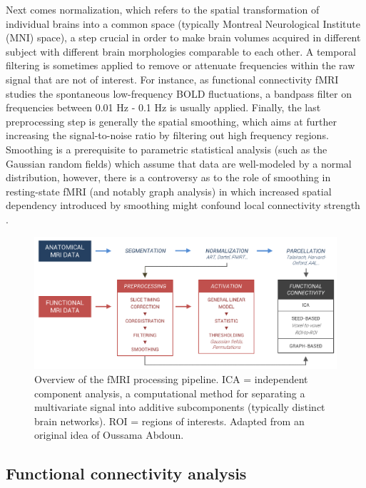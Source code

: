 Next comes normalization, which refers to the spatial transformation of individual brains into a common space (typically Montreal Neurological Institute (MNI) space), a step crucial in order to make brain volumes acquired in different subject with different brain morphologies comparable to each other. A temporal filtering is sometimes applied to remove or attenuate frequencies within the raw signal that are not of interest. For instance, as functional connectivity fMRI studies the spontaneous low-frequency BOLD fluctuations, a bandpass filter on frequencies between 0.01 Hz - 0.1 Hz is usually applied. Finally, the last preprocessing step is generally the spatial smoothing, which aims at further increasing the signal-to-noise ratio by filtering out high frequency regions. Smoothing is a prerequisite to parametric statistical analysis (such as the Gaussian random fields) which assume that data are well-modeled by a normal distribution, however, there is a controversy as to the role of smoothing in resting-state fMRI (and notably graph analysis) in which increased spatial dependency introduced by smoothing might confound local connectivity strength \citep{hayasaka_comparison_2010}.

\begin{figure}[htb]
	\includegraphics[width=\textwidth]{Fig/Methods/fMRI_pipeline/fMRI_pipeline_perso.png}
	\caption[Overview of the fMRI processing pipeline]{Overview of the fMRI processing pipeline. ICA = independent component analysis, a computational method for separating a multivariate signal into additive subcomponents (typically distinct brain networks). ROI = regions of interests. Adapted from an original idea of Oussama Abdoun.}
	\label{fig:methods:fmri-pipeline}
\end{figure}

\subsection{Functional connectivity analysis}
\label{sec:fmri:rs:analysis}

